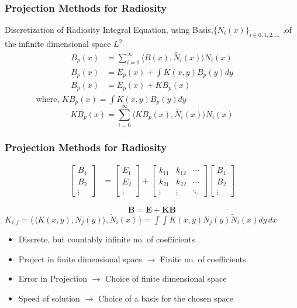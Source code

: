     \begin{frame}\frametitle{Projection Methods for Radiosity}
Discretization of Radiosity Integral Equation, using Basis,$\{N_i(x)\}_{i \in 0,1,2,...}$ ,of the infinite dimensional space $L^2$
\begin{align}
B_p(x) &= \sum_{i=0}^{\infty} \langle B(x),\tilde{N_i}(x) \rangle N_i(x) \\
B_p(x) &= E_p(x)+\int K(x,y)B_p(y) dy \\
B_p(x) &= E_p(x)+ K B_p(x)
\end{align}
~~~~~~~ where, $K B_p(x) = \int K(x,y) B_p(y)dy$
\begin{equation}
K B_p(x) = \sum_{i=0}^{\infty} \langle K B_p(x),\tilde{N_i}(x) \rangle N_i(x) 
\end{equation}

    \end{frame}
    
    \begin{frame}\frametitle{Projection Methods for Radiosity}
    \begin{align}
\begin{bmatrix}
	B_1 \\
	B_2 \\
	\vdots
\end{bmatrix}
&=
\begin{bmatrix}
	E_1 \\
	E_2 \\
	\vdots
\end{bmatrix}
+
\begin{bmatrix}
    k_{11} & k_{12} & \cdots \\
    k_{21} & k_{22} & \cdots \\
    \vdots & \vdots & \ddots 
\end{bmatrix}
\begin{bmatrix}
	B_1 \\
	B_2 \\
	\vdots
\end{bmatrix}
\end{align}

\begin{equation}
\textbf{B} = \textbf{E} + \textbf{K}\textbf{B}
\end{equation}
$K_{i,j}=\langle\, \langle K(x,y),N_j(y)\rangle,\tilde{N}_i(x) \,\rangle =\int \int K(x,y)N_j(y)\tilde{N}_i(x) dy\,dx$

\begin{itemize}
\item Discrete, but countably infinite no. of coefficients
\item Project in finite dimensional space $\rightarrow$ Finite no. of coefficients
\item Error in Projection $\rightarrow$ Choice of finite dimensional space
\item Speed of solution $\rightarrow$ Choice of a basis for the chosen space
\end{itemize}
    \end{frame}

